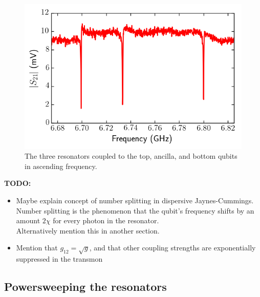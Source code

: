         \begin{figure}[tb]
          \centering
          \includegraphics[width=.7\textwidth]{../Figures/Qubit characterization/Resonator scans.png}
          \caption{The three resonators coupled to the top, ancilla, and bottom qubits in ascending frequency.}
          \label{fig:Three resonators}
        \end{figure}

        \textbf{TODO:}
        \begin{itemize}
          \item Maybe explain concept of number splitting in dispersive Jaynes-Cummings. Number splitting is the phenomenon that the qubit's frequency shifts by an amount $2 \chi$ for every photon in the resonator.\\
                Alternatively mention this in another section.
          \item Mention that $g_{12}=\sqrt{g}$, and that other coupling strengths are exponentially suppressed in the transmon
        \end{itemize}


      \subsection{Powersweeping the resonators}
        \label{ssec:powersweep}


